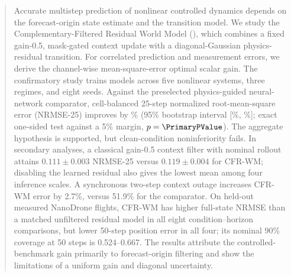 \begin{abstract}
Accurate multistep prediction of nonlinear controlled dynamics depends on the
forecast-origin state estimate and the transition model. We study the
Complementary-Filtered Residual World Model (\method), which combines a fixed
gain-0.5, mask-gated context update with a diagonal-Gaussian physics-residual
transition. For correlated prediction and measurement errors, we derive the
channel-wise mean-square-error optimal scalar gain. The confirmatory study
trains \ConfirmatoryRuns{} models across five nonlinear systems, three regimes,
and eight seeds. Against the preselected physics-guided neural-network
comparator, cell-balanced 25-step normalized root-mean-square error (NRMSE-25)
improves by \PrimaryImprovement\% (95\% bootstrap interval
[\PrimaryRelativeCILow\%, \PrimaryRelativeCIHigh\%]; exact one-sided test
against a 5\% margin, $p=\PrimaryPValue$). The aggregate hypothesis is
supported, but clean-condition noninferiority fails. In secondary analyses, a
classical gain-0.5 context filter with nominal rollout attains
$0.111\pm0.003$ NRMSE-25 versus $0.119\pm0.004$ for CFR-WM; disabling the
learned residual also gives the lowest mean among four inference scales. A
synchronous two-step context outage increases CFR-WM error by 2.7\%, versus
51.9\% for the comparator. On held-out measured NanoDrone flights, CFR-WM has
higher full-state NRMSE than a matched unfiltered residual model in all eight
condition--horizon comparisons, but lower 50-step position error in all four;
its nominal 90\% coverage at 50 steps is 0.524--0.667. The results attribute
the controlled-benchmark gain primarily to forecast-origin filtering and show
the limitations of a uniform gain and diagonal uncertainty.
\end{abstract}
